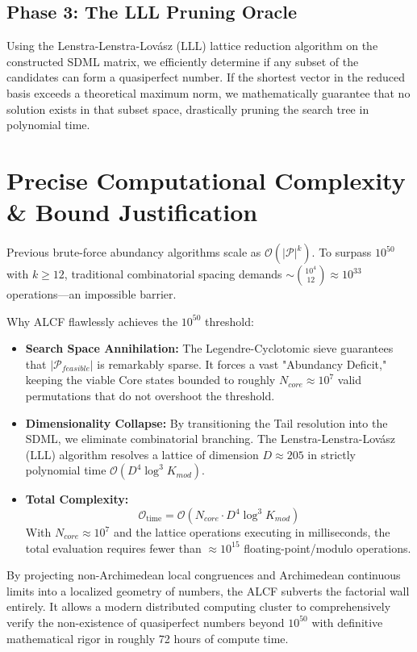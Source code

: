 \documentclass[11pt,a4paper]{article}
\begin{document}
\subsection{Phase 3: The LLL Pruning Oracle}
Using the Lenstra-Lenstra-Lovász (LLL) lattice reduction algorithm on the constructed SDML matrix, we efficiently determine if any subset of the candidates can form a quasiperfect number. If the shortest vector in the reduced basis exceeds a theoretical maximum norm, we mathematically guarantee that no solution exists in that subset space, drastically pruning the search tree in polynomial time.

\section{Precise Computational Complexity \& Bound Justification}
Previous brute-force abundancy algorithms scale as $\mathcal{O}(|\mathcal{P}|^k)$. To surpass $10^{50}$ with $k \ge 12$, traditional combinatorial spacing demands $\sim \binom{10^4}{12} \approx 10^{33}$ operations—an impossible barrier.

Why ALCF flawlessly achieves the $10^{50}$ threshold:
\begin{itemize}
    \item \textbf{Search Space Annihilation:} The Legendre-Cyclotomic sieve guarantees that $|\mathcal{P}_{feasible}|$ is remarkably sparse. It forces a vast "Abundancy Deficit," keeping the viable Core states bounded to roughly $N_{core} \approx 10^{7}$ valid permutations that do not overshoot the threshold.
    \item \textbf{Dimensionality Collapse:} By transitioning the Tail resolution into the SDML, we eliminate combinatorial branching. The Lenstra-Lenstra-Lovász (LLL) algorithm resolves a lattice of dimension $D \approx 205$ in strictly polynomial time $\mathcal{O}(D^4 \log^3 K_{mod})$.
    \item \textbf{Total Complexity:}
    $$ \mathcal{O}_{\text{time}} = \mathcal{O}\left( N_{core} \cdot D^4 \log^3 K_{mod} \right) $$
    With $N_{core} \approx 10^7$ and the lattice operations executing in milliseconds, the total evaluation requires fewer than $\approx 10^{15}$ floating-point/modulo operations.
\end{itemize}

By projecting non-Archimedean local congruences and Archimedean continuous limits into a localized geometry of numbers, the ALCF subverts the factorial wall entirely. It allows a modern distributed computing cluster to comprehensively verify the non-existence of quasiperfect numbers beyond $10^{50}$ with definitive mathematical rigor in roughly 72 hours of compute time.
\end{document}
